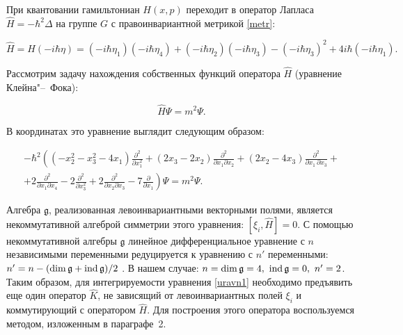 При квантовании гамильтониан $ H(x,p) $ переходит в оператор Лапласа $ \hat{H}=-\hbar^2\Delta $ на группе $ G $ с правоинвариантной метрикой \eqref{metr}:

\begin{equation}\label{hH}

\hat{H}=H(-i\hbar\eta)=(-i\hbar\eta_1)(-i\hbar\eta_4)+(-i\hbar\eta_2)(-i\hbar\eta_3)-(-i\hbar\eta_3)^2+4i\hbar (-i\hbar\eta_1).

\end{equation}



Рассмотрим задачу нахождения собственных функций оператора $ \hat{H} $ (уравнение Клейна"--~Фока):

\begin{equation}\label{uravn1}

\hat{H}\Psi = m^2\Psi.

\end{equation}

В координатах это уравнение выглядит следующим образом: 



\pagebreak



\begin{multline*}

-\hbar^2 \left(

(-x_{2}^2-x_{3}^2-4x_{1})\frac{\partial ^2}{\partial x_{1}^2}+

(2x_{3}-2x_{2})\frac{\partial ^2}{\partial x_{1}\partial x_{2}}+(2x_{2}-4x_{3})\frac{\partial ^2}{\partial x_{1}\,\partial x_{3}} +\right.\\ 

\left. +2\frac{\partial ^2}{\partial x_{1}\partial x_{4}}-2\frac{\partial ^2}{\partial x_{3}^2}

+2\frac{\partial ^2}{\partial x_{2}\partial x_{3}}-7\frac{\partial}{\partial x_{1}}

 \right)\Psi=m^2\Psi.

\end{multline*}





Алгебра $\mathfrak{g}$, реализованная левоинвариантными векторными полями, является некоммутативной алгеброй симметрии этого уравнения: $ [\xi_i,\hat{H}]=0 $. С помощью некоммутативной алгебры $\mathfrak{g}$ линейное дифференциальное уравнение с $ n $ независимыми переменными редуцируется к уравнению с $ n' $ переменными: $ n'=n-(\dim\mathfrak{g}+{\rm ind}\,\mathfrak{g})/2 $ \cite{ShaShi95,BarMikShi01}. В нашем случае: $ n=\dim\mathfrak{g}=4,\ {\rm ind}\,\mathfrak{g}=0,\ n'=2 $. Таким образом, для интегрируемости уравнения \eqref{uravn1} необходимо предъявить еще один оператор $ \hat{K} $, не зависящий от  левоинвариантных полей $ \xi_i $ и коммутирующий с оператором $ \hat{H} $. Для построения этого оператора воспользуемся методом, изложенным в параграфе~2. 




